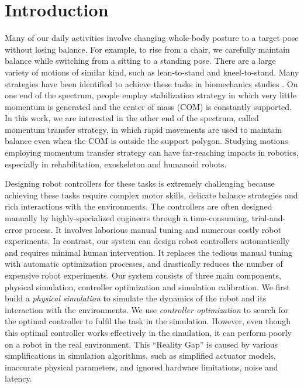 \section{Introduction}

Many of our daily activities involve changing whole-body posture to a target pose without losing balance. For example, to rise from a chair, we carefully maintain balance while switching from a sitting to a standing pose. There are a large variety of motions of similar kind, such as lean-to-stand and kneel-to-stand. Many strategies have been identified to achieve these tasks in biomechanics studies \cite{schenkman:1990,riley:1991,hughes:1994,hughes:1996}. On one end of the spectrum, people employ stabilization strategy in which very  little momentum is generated and the center of mass (COM) is constantly supported. In this work, we are interested in the other end of the spectrum, called momentum transfer strategy, in which rapid movements are used to maintain balance even when the COM is outside the support polygon. Studying motions employing momentum transfer strategy can have far-reaching impacts in robotics, especially in rehabilitation, exoskeleton and humanoid robots. 

Designing robot controllers for these tasks is extremely challenging because achieving these tasks require complex motor skills, delicate balance strategies and rich interactions with the environments. The controllers are often designed manually by highly-specialized engineers through a time-consuming, trial-and-error process. It involves laborious manual tuning and numerous costly robot experiments. In contrast, our system can design robot controllers automatically and requires minimal human intervention. It replaces the tedious manual tuning with automatic optimization processes, and drastically reduces the number of expensive robot experiments. Our system consists of three main components, physical simulation, controller optimization and simulation calibration. We first build a \emph{physical simulation} to simulate the dynamics of the robot and its interaction with the environments. We use \emph{controller optimization} to search for the optimal controller to fulfil the task in the simulation. However, even though this optimal controller works effectively in the simulation, it can perform poorly on a robot in the real environment. This ``Reality Gap'' \cite{Jakobi95} is caused by various simplifications in simulation algorithms, such as simplified actuator models, inaccurate physical parameters, and ignored hardware limitations, noise and latency. 

